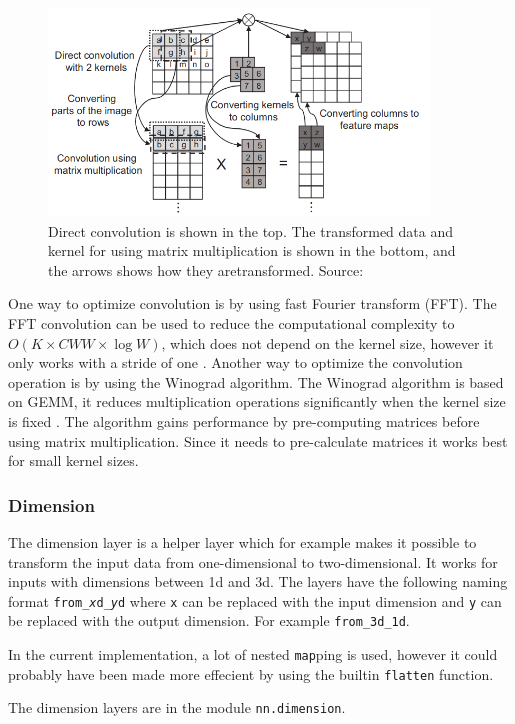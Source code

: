 \begin{figure}
    \centering
    \includegraphics[width=0.9\textwidth]{assets/conv-matrix.png}
    \caption{Direct convolution is shown in the top. The transformed data and kernel for using matrix multiplication is shown in the bottom, and the arrows shows how they aretransformed. Source: \cite{perfomance_analysis_cnn}}
    \label{fig:conv_matrix}
\end{figure}

One way to optimize convolution is by using fast Fourier transform (FFT). The FFT convolution can be used to reduce the computational complexity to $O(K\times CWW \times \log W)$, which does not depend on the kernel size, however it only works with a stride of one \cite{perfomance_analysis_cnn}.
Another way to optimize the convolution operation is by using the Winograd algorithm. The Winograd algorithm is based on GEMM, it reduces multiplication operations significantly when the kernel size is fixed \cite{perfomance_analysis_cnn}. The algorithm gains performance by pre-computing matrices before using matrix multiplication. Since it needs to pre-calculate matrices it works best for small kernel sizes.



\subsubsection{Dimension}%
\label{ssub:impl_dimension}

The dimension layer is a helper layer which for example makes it possible to transform the input data from one-dimensional to two-dimensional.
It works for inputs with dimensions between 1d and 3d. The layers have the following naming format \texttt{from\_\textit{x}d\_\textit{y}d} where \texttt{x} can be replaced with the input dimension and \texttt{y} can be replaced with the output dimension. For example \texttt{from\_3d\_1d}.

In the current implementation, a lot of nested \texttt{map}ping is used, however it could probably have been made more effecient by using the builtin \texttt{flatten} function.

The dimension layers are in the module \texttt{nn.dimension}.

